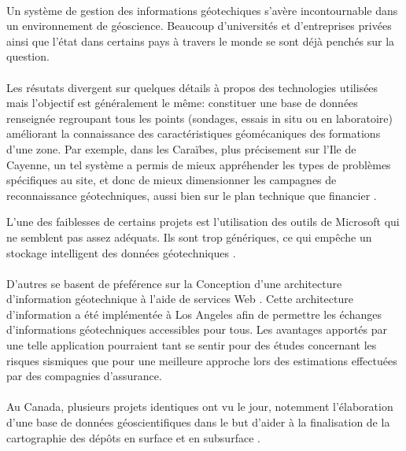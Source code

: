\paragraph{}
Un système de gestion des informations géotechiques s'avère incontournable
dans un environnement de géoscience. Beaucoup d'universités et d'entreprises 
privées ainsi que l'état dans certains pays à travers le monde se sont déjà 
penchés sur la question. 
\paragraph{}
Les résutats divergent sur quelques détails à propos des technologies utilisées mais 
l'objectif est généralement le même: 
constituer une base de données renseignée regroupant tous les points (sondages, essais
in situ ou en laboratoire) améliorant la connaissance des caractéristiques géomécaniques des
formations d'une zone.
Par exemple, dans les Caraïbes, plus précisement sur l'Ile de Cayenne, un tel système a permis
de mieux appréhender les types de problèmes
spécifiques au site, et donc de mieux dimensionner les campagnes de reconnaissance
géotechniques, aussi bien sur le plan technique que financier
\cite{Cayenne}.
\par
L'une des faiblesses de certains projets est l'utilisation des outils de Microsoft
qui ne semblent pas assez 
adéquats. Ils sont trop génériques, ce qui empêche un stockage intelligent des données géotechniques
\cite{antoljak2012subsurface}.


\paragraph{}D'autres se basent de pŕeférence sur la Conception d'une architecture d'information 
géotechnique à l'aide de services Web
\cite{zimmermann2003design}.
Cette architecture d'information a été implémentée à Los Angeles afin de permettre les échanges 
d'informations géotechniques accessibles pour tous. Les avantages apportés par une telle 
application pourraient tant se sentir pour des études concernant les risques sismiques que pour 
une meilleure approche lors des estimations effectuées par des compagnies d'assurance. 

\paragraph{}
Au Canada, plusieurs projets identiques ont vu le jour, notemment l'élabora\-tion d'une base 
de données géoscientifiques dans le but d’aider à la finalisation de la 
cartographie des dépôts en surface et en subsurface
\cite{russell1996regional}.

